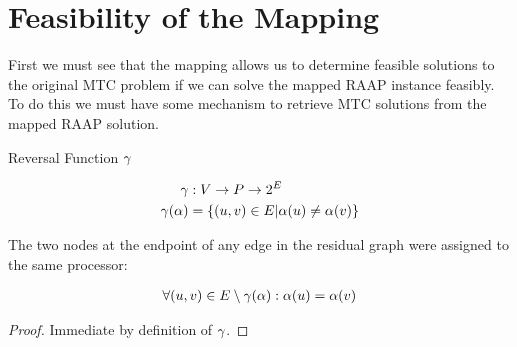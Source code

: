 \section{Feasibility of the Mapping}
\label{secHardFeas}

First we must see that the mapping allows us to determine feasible solutions to the original MTC problem if we can solve the mapped RAAP instance feasibly.
To do this we must have some mechanism to retrieve MTC solutions from the mapped RAAP solution.

\begin{definition}
Reversal Function $\gamma$

\begin{align}
	\nonumber \gamma & : V \rightarrow P \rightarrow 2^E \\
	\nonumber \gamma(\alpha) & = \{(u,v) \in E | \alpha(u) \neq \alpha(v)\}
\end{align}
\end{definition}

\begin{lemma}
\label{EDGEASSIGN}
The two nodes at the endpoint of any edge in the residual graph were assigned to the same processor:

\begin{align}
	\nonumber \forall(u, v) \in E \setminus \gamma(\alpha) : \alpha(u) = \alpha(v)
\end{align}
\end{lemma}
\begin{proof}
Immediate by definition of $\gamma$.
\end{proof}

